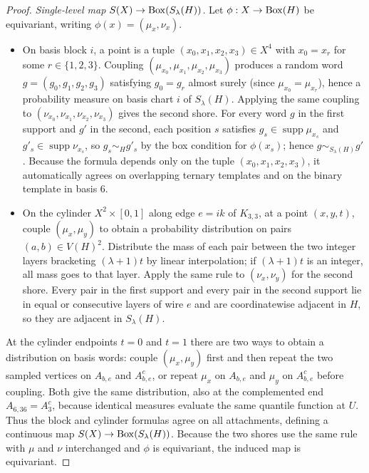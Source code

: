 \begin{proof}
\emph{Single-level map $S(X)\to\operatorname{Box}(S_\lambda(H))$.} Let $\phi:X\to\operatorname{Box}(H)$ be equivariant, writing $\phi(x)=(\mu_x,\nu_x)$.
\begin{itemize}
\item On basis block $i$, a point is a tuple $(x_0,x_1,x_2,x_3)\in X^4$ with $x_0=x_r$ for some $r\in\{1,2,3\}$. Coupling $(\mu_{x_0},\mu_{x_1},\mu_{x_2},\mu_{x_3})$ produces a random word $g=(g_0,g_1,g_2,g_3)$ satisfying $g_0=g_r$ almost surely (since $\mu_{x_0}=\mu_{x_r}$), hence a probability measure on basis chart $i$ of $S_\lambda(H)$. Applying the same coupling to $(\nu_{x_0},\nu_{x_1},\nu_{x_2},\nu_{x_3})$ gives the second shore. For every word $g$ in the first support and $g'$ in the second, each position $s$ satisfies $g_s\in\operatorname{supp}\mu_{x_s}$ and $g'_s\in\operatorname{supp}\nu_{x_s}$, so $g_s\sim_H g'_s$ by the box condition for $\phi(x_s)$; hence $g\sim_{S_\lambda(H)} g'$. Because the formula depends only on the tuple $(x_0,x_1,x_2,x_3)$, it automatically agrees on overlapping ternary templates and on the binary template in basis $6$.
\item On the cylinder $X^2\times[0,1]$ along edge $e=ik$ of $K_{3,3}$, at a point $(x,y,t)$, couple $(\mu_x,\mu_y)$ to obtain a probability distribution on pairs $(a,b)\in V(H)^2$. Distribute the mass of each pair between the two integer layers bracketing $(\lambda+1)t$ by linear interpolation; if $(\lambda+1)t$ is an integer, all mass goes to that layer. Apply the same rule to $(\nu_x,\nu_y)$ for the second shore. Every pair in the first support and every pair in the second support lie in equal or consecutive layers of wire $e$ and are coordinatewise adjacent in $H$, so they are adjacent in $S_\lambda(H)$.
\end{itemize}
At the cylinder endpoints $t=0$ and $t=1$ there are two ways to obtain a distribution on basis words: couple $(\mu_x,\mu_y)$ first and then repeat the two sampled vertices on $A_{b,e}$ and $A_{b,e}^c$, or repeat $\mu_x$ on $A_{b,e}$ and $\mu_y$ on $A_{b,e}^c$ before coupling. Both give the same distribution, also at the complemented end $A_{6,36}=A_3^c$, because identical measures evaluate the same quantile function at $U$. Thus the block and cylinder formulas agree on all attachments, defining a continuous map $S(X)\to\operatorname{Box}(S_\lambda(H))$. Because the two shores use the same rule with $\mu$ and $\nu$ interchanged and $\phi$ is equivariant, the induced map is equivariant.


\end{proof}
